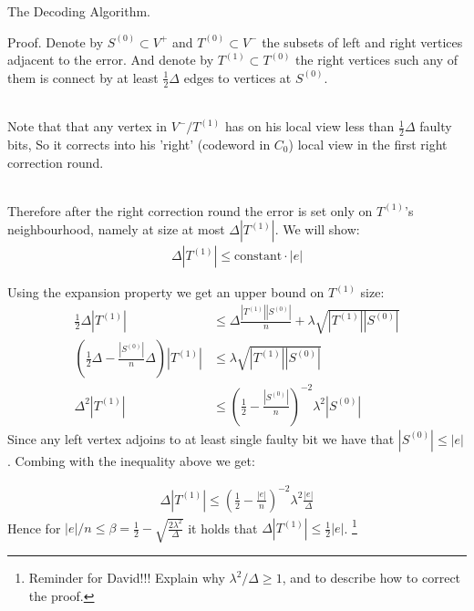 \documentclass{beamer}
\begin{document}
\begin{frame}{The Decoding Algorithm.}
  \begin{block}{Proof.}
  Denote by $S^{(0)} \subset V^{+}$ and  $T^{(0)} \subset V^{-}$ the subsets of left and right vertices adjacent to the error. And denote by $T^{(1)} \subset T^{(0)}$ the right vertices such any of them is connect by at least $\frac{1}{2}\Delta$ edges to vertices at $S^{(0)}$. \\~\

  Note that that any vertex in $V^{-}/T^{(1)}$ has on his local view less than $\frac{1}{2}\Delta$ faulty bits, So it corrects into his 'right' (codeword in $C_{0}$) local view in the first right correction round. \\~\

  Therefore after the right correction round the error is set only on $T^{(1)}$'s neighbourhood, namely at size at most $\Delta|T^{(1)}|$. We will show:
  \begin{equation*}
    \begin{split}
  \Delta|T^{(1)}| \le \text{constant} \cdot |e|
    \end{split}
  \end{equation*}
\end{block}
\end{frame}
\begin{frame}

  Using the expansion property we get an upper bound on $T^{(1)}$ size: \begin{equation*}
  \begin{split} 
    \frac{1}{2}\Delta |T^{(1)}| & \le \Delta \frac{|T^{(1)}||S^{(0)}|}{n} + \lambda\sqrt{|T^{(1)}||S^{(0)}|} \\ 
  \left( \frac{1}{2}  \Delta - \frac{|S^{(0)}|}{n} \Delta \right) |T^{(1)}| & \le \lambda \sqrt{|T^{(1)}||S^{(0)}|} \\ 
  \Delta^{2}|T^{(1)}| & \le \left( \frac{1}{2}  - \frac{|S^{(0)}|}{n}  \right)^{-2}\lambda^{2} |S^{(0)}| 
  \end{split}
\end{equation*}
Since any left vertex adjoins to at least single faulty bit we have that $|S^{(0)}| \le |e|$. Combing with the inequality above we get:  

\begin{equation*}
  \begin{split}
    \Delta |T^{(1)}| \le \left( \frac{1}{2}   - \frac{|e|}{n} \right)^{-2}\lambda^{2} \frac{|e|}{\Delta}
  \end{split}
\end{equation*}
Hence for $|e|/n \le \beta =  \frac{1}{2}   - \sqrt{\frac{2\lambda^{2}}{\Delta}}$ it holds that $\Delta|T^{(1)}| \le \frac{1}{2}|e|$. \footnote{Reminder for David!!! Explain why $\lambda^2/\Delta \ge 1 $, and to describe how to correct the proof.}




\end{frame}
\end{document}
